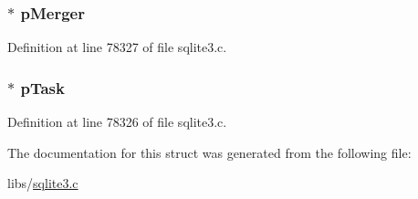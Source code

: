 \subsubsection[{p\+Merger}]{$\ast$ p\+Merger}\label{struct_incr_merger_ab9ebb5ec47cc445078cf9ffb98b9e66f}


Definition at line 78327 of file sqlite3.\+c.

\hypertarget{struct_incr_merger_ab1de7a866e3b281bba80ccb606ec2ae1}{}
\subsubsection[{p\+Task}]{$\ast$ p\+Task}\label{struct_incr_merger_ab1de7a866e3b281bba80ccb606ec2ae1}


Definition at line 78326 of file sqlite3.\+c.



The documentation for this struct was generated from the following file\+:\begin{DoxyCompactItemize}
\item 
libs/\hyperlink{sqlite3_8c}{sqlite3.\+c}\end{DoxyCompactItemize}

